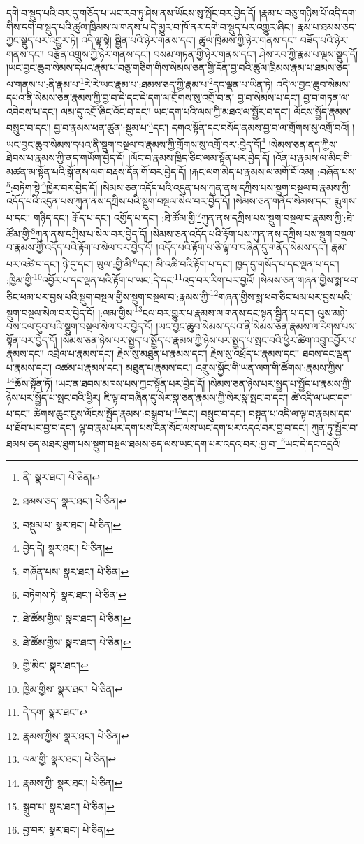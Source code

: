 དགེ་བ་སྡུད་པའི་བར་དུ་གཅོད་པ་ཡང་རབ་ཏུ་ཤེས་ནས་ཡོངས་སུ་སྤོང་བར་བྱེད་དོ། །རྣམ་པ་བཅུ་གཉིས་པོ་འདི་དག་གིས་དགེ་བ་སྡུད་པའི་ཚུལ་ཁྲིམས་ལ་གནས་པ་དེ་མྱུར་བ་ཁོ་ནར་དགེ་བ་སྡུད་པར་འགྱུར་ཞིང་། རྣམ་པ་ཐམས་ཅད་ཀྱང་སྡུད་པར་འགྱུར་ཏེ། འདི་ལྟ་སྟེ། སྦྱིན་པའི་ཉེར་གནས་དང་། ཚུལ་ཁྲིམས་ཀྱི་ཉེར་གནས་དང་། བཟོད་པའི་ཉེར་གནས་དང་། བརྩོན་འགྲུས་ཀྱི་ཉེར་གནས་དང་། བསམ་གཏན་གྱི་ཉེར་གནས་དང་། ཤེས་རབ་ཀྱི་རྣམ་པ་ལྔས་སྡུད་དོ། །ཡང་བྱང་ཆུབ་སེམས་དཔའ་རྣམ་པ་བཅུ་གཅིག་གིས་སེམས་ཅན་གྱི་དོན་བྱ་བའི་ཚུལ་ཁྲིམས་རྣམ་པ་ཐམས་ཅད་ལ་གནས་པ་:ནི་རྣམ་པ་\footnote{ནི་  སྣར་ཐང་།  པེ་ཅིན། }རེ་རེ་ཡང་རྣམ་པ་:ཐམས་ཅད་ཀྱི་རྣམ་པ་\footnote{ཐམས་ཅད་  སྣར་ཐང་།  པེ་ཅིན། }དང་ལྡན་པ་ཡིན་ཏེ། འདི་ལ་བྱང་ཆུབ་སེམས་དཔའ་ནི་སེམས་ཅན་རྣམས་ཀྱི་བྱ་བ་དེ་དང་དེ་དག་ལ་གྲོགས་སུ་འགྲོ་བ་ན། བྱ་བ་སེམས་པ་དང་། བྱ་བ་གཏན་ལ་འབེབས་པ་དང་། ལམ་དུ་འགྲོ་ཞིང་འོང་བ་དང་། ཡང་དག་པའི་ལས་ཀྱི་མཐའ་ལ་སྦྱོར་བ་དང་། ལོངས་སྤྱོད་རྣམས་བསྲུང་བ་དང་། བྱ་བ་རྣམས་ཕན་ཚུན་:སྡུམ་པ་\footnote{བསྔུམ་པ་  སྣར་ཐང་།  པེ་ཅིན། }དང་། དགའ་སྟོན་དང་བསོད་ནམས་བྱ་བ་ལ་གྲོགས་སུ་འགྲོ་བའོ། །ཡང་བྱང་ཆུབ་སེམས་དཔའ་ནི་སྡུག་བསྔལ་བ་རྣམས་ཀྱི་གྲོགས་སུ་འགྲོ་བར་:བྱེད་དོ།\footnote{བྱེད་དེ།  སྣར་ཐང་།  པེ་ཅིན། } །སེམས་ཅན་ནད་ཀྱིས་ཐེབས་པ་རྣམས་ཀྱི་ནད་གཡོག་བྱེད་དོ། །ལོང་བ་རྣམས་ཁྲིད་ཅིང་ལམ་སྟོན་པར་བྱེད་དོ། །འོན་པ་རྣམས་ལ་མིང་གི་མཚན་མ་སྟོན་པའི་སྒོ་ནས་ལག་བརྡས་དོན་གོ་བར་བྱེད་དོ། །རྐང་ལག་མེད་པ་རྣམས་ལ་མགོ་བོ་འམ། :བཞོན་པས་\footnote{གཞོན་པས་  སྣར་ཐང་།  པེ་ཅིན། }:བཏེག་སྟེ་\footnote{བཏེགས་ཏེ་  སྣར་ཐང་།  པེ་ཅིན། }ཁྱེར་བར་བྱེད་དོ། །སེམས་ཅན་འདོད་པའི་འདུན་པས་ཀུན་ནས་དཀྲིས་པས་སྡུག་བསྔལ་བ་རྣམས་ཀྱི་འདོད་པའི་འདུན་པས་ཀུན་ནས་དཀྲིས་པའི་སྡུག་བསྔལ་སེལ་བར་བྱེད་དོ། །སེམས་ཅན་གནོད་སེམས་དང་། རྨུགས་པ་དང་། གཉིད་དང་། རྒོད་པ་དང་། འགྱོད་པ་དང་། :ཐེ་ཚོམ་གྱི་\footnote{ཐེ་ཚོམ་གྱིས་  སྣར་ཐང་།  པེ་ཅིན། }ཀུན་ནས་དཀྲིས་པས་སྡུག་བསྔལ་བ་རྣམས་ཀྱི་:ཐེ་ཚོམ་གྱི་\footnote{ཐེ་ཚོམ་གྱིས་  སྣར་ཐང་།  པེ་ཅིན། }ཀུན་ནས་དཀྲིས་པ་སེལ་བར་བྱེད་དོ། །སེམས་ཅན་འདོད་པའི་རྟོག་པས་ཀུན་ནས་དཀྲིས་པས་སྡུག་བསྔལ་བ་རྣམས་ཀྱི་འདོད་པའི་རྟོག་པ་སེལ་བར་བྱེད་དོ། །འདོད་པའི་རྟོག་པ་ཅི་ལྟ་བ་བཞིན་དུ་གནོད་སེམས་དང་། རྣམ་པར་འཚེ་བ་དང་། ཉེ་དུ་དང་། ཡུལ་:གྱི་མི་\footnote{གྱི་མིང་  སྣར་ཐང་། }དང་། མི་འཆི་བའི་རྟོག་པ་དང་། ཁྱད་དུ་གསོད་པ་དང་ལྡན་པ་དང་། :ཁྱིམ་གྱི་\footnote{ཁྱིམ་གྱིས་  སྣར་ཐང་།  པེ་ཅིན། }འབྱོར་པ་དང་ལྡན་པའི་རྟོག་པ་ཡང་:དེ་དང་\footnote{དེ་དག་  སྣར་ཐང་། }འདྲ་བར་རིག་པར་བྱའོ། །སེམས་ཅན་གཞན་གྱིས་སྨ་ཕབ་ཅིང་ཕམ་པར་བྱས་པའི་སྡུག་བསྔལ་གྱིས་སྡུག་བསྔལ་བ་:རྣམས་ཀྱི་\footnote{རྣམས་ཀྱིས་  སྣར་ཐང་།  པེ་ཅིན། }གཞན་གྱིས་སྨ་ཕབ་ཅིང་ཕམ་པར་བྱས་པའི་སྡུག་བསྔལ་སེལ་བར་བྱེད་དོ། །:ལམ་གྱིས་\footnote{ལམ་གྱི་  སྣར་ཐང་།  པེ་ཅིན། }ངལ་བར་གྱུར་པ་རྣམས་ལ་གནས་དང་སྟན་སྦྱིན་པ་དང་། ལུས་མཉེ་བས་ངལ་དུབ་པའི་སྡུག་བསྔལ་སེལ་བར་བྱེད་དོ། །ཡང་བྱང་ཆུབ་སེམས་དཔའ་ནི་སེམས་ཅན་རྣམས་ལ་རིགས་པས་སྟོན་པར་བྱེད་དོ། །སེམས་ཅན་ཉེས་པར་སྤྱད་པ་སྤྱོད་པ་རྣམས་ཀྱི་ཉེས་པར་སྤྱད་པ་སྤང་བའི་ཕྱིར་ཚིག་འབྲུ་འབྱོར་པ་རྣམས་དང་། འབྲེལ་པ་རྣམས་དང་། རྗེས་སུ་མཐུན་པ་རྣམས་དང་། རྗེས་སུ་འཕྲོད་པ་རྣམས་དང་། ཐབས་དང་ལྡན་པ་རྣམས་དང་། འཚམ་པ་རྣམས་དང་། མཐུན་པ་རྣམས་དང་། འགྲུས་སྐྱོང་གི་ཡན་ལག་གི་ཚོགས་:རྣམས་ཀྱིས་\footnote{རྣམས་ཀྱི་  སྣར་ཐང་།  པེ་ཅིན། }ཆོས་སྟོན་ཏོ། །ཡང་ན་ཐབས་མཁས་པས་ཀྱང་སྟོན་པར་བྱེད་དོ། །སེམས་ཅན་ཉེས་པར་སྤྱད་པ་སྤྱོད་པ་རྣམས་ཀྱི་ཉེས་པར་སྤྱོད་པ་སྤང་བའི་ཕྱིར། ཇི་ལྟ་བ་བཞིན་དུ་སེར་སྣ་ཅན་རྣམས་ཀྱི་སེར་སྣ་སྤང་བ་དང་། ཚེ་འདི་ལ་ཡང་དག་པ་དང་། ཚེགས་ཆུང་ངུས་ལོངས་སྤྱོད་རྣམས་:བསྒྲུབ་པ་\footnote{སྒྲུབ་པ་  སྣར་ཐང་།  པེ་ཅིན། }དང་། བསྲུང་བ་དང་། བསྟན་པ་འདི་ལ་ལྟ་བ་རྣམས་དད་པ་ཐོབ་པར་བྱ་བ་དང་། ལྟ་བ་རྣམ་པར་དག་པས་ངན་སོང་ལས་ཡང་དག་པར་འདའ་བར་བྱ་བ་དང་། ཀུན་ཏུ་སྦྱོར་བ་ཐམས་ཅད་མཐར་ཐུག་པས་སྡུག་བསྔལ་ཐམས་ཅད་ལས་ཡང་དག་པར་འདའ་བར་:བྱ་བ་\footnote{བྱ་བར་  སྣར་ཐང་།  པེ་ཅིན། }ཡང་དེ་དང་འདྲའོ། 